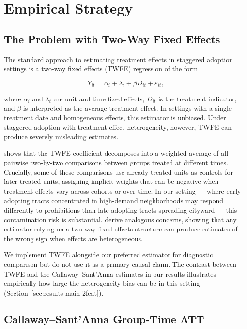 \section{Empirical Strategy}\label{sec:methods}

\subsection{The Problem with Two-Way Fixed Effects}

The standard approach to estimating treatment effects in staggered adoption settings is a two-way fixed effects (TWFE) regression of the form

\[
Y_{it} = \alpha_i + \lambda_t + \beta D_{it} + \varepsilon_{it},
\]

where $\alpha_i$ and $\lambda_t$ are unit and time fixed effects, $D_{it}$ is the treatment indicator, and $\beta$ is interpreted as the average treatment effect. In settings with a single treatment date and homogeneous effects, this estimator is unbiased. Under staggered adoption with treatment effect heterogeneity, however, TWFE can produce severely misleading estimates.

\citet{goodman-bacon2021difference} shows that the TWFE coefficient decomposes into a weighted average of all pairwise two-by-two comparisons between groups treated at different times. Crucially, some of these comparisons use already-treated units as controls for later-treated units, assigning implicit weights that can be negative when treatment effects vary across cohorts or over time. In our setting --- where early-adopting tracts concentrated in high-demand neighborhoods may respond differently to prohibitions than late-adopting tracts spreading cityward --- this contamination risk is substantial. \citet{de-chaisemartin2020two} derive analogous concerns, showing that any estimator relying on a two-way fixed effects structure can produce estimates of the wrong sign when effects are heterogeneous.

We implement TWFE alongside our preferred estimator for diagnostic comparison but do not use it as a primary causal claim. The contrast between TWFE and the Callaway--Sant'Anna estimates in our results illustrates empirically how large the heterogeneity bias can be in this setting (Section~\ref{sec:results-main-2feat}).

\subsection{Callaway--Sant'Anna Group-Time ATT}

